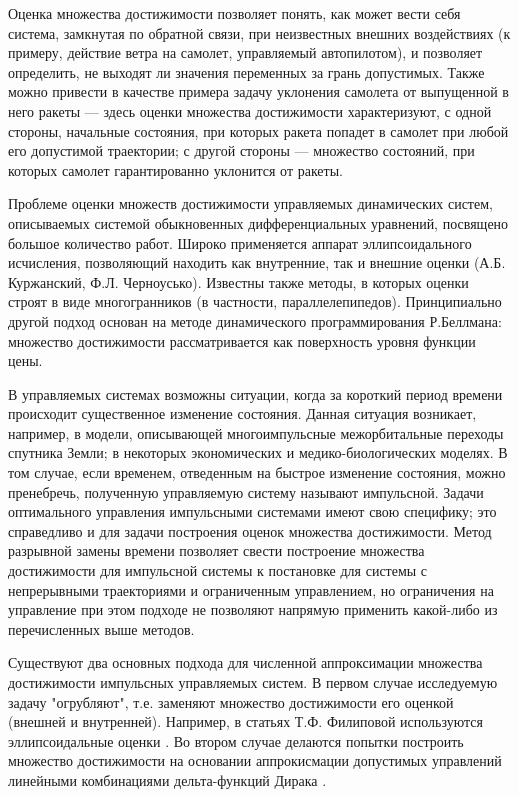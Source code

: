 \documentclass[a4paper,12pt]{article}
\begin{document}
Оценка множества достижимости позволяет понять, как может вести себя
система, замкнутая по обратной связи, при неизвестных внешних
воздействиях (к примеру, действие ветра на самолет, управляемый
автопилотом), и позволяет определить, не выходят ли значения
переменных за грань допустимых.  Также можно привести в качестве
примера задачу уклонения самолета от выпущенной в него ракеты ---
здесь оценки множества достижимости характеризуют, с одной стороны,
начальные состояния, при которых ракета попадет в самолет при любой
его допустимой траектории; с другой стороны --- множество состояний,
при которых самолет гарантированно уклонится от ракеты.

Проблеме оценки множеств достижимости управляемых динамических систем,
описываемых системой обыкновенных дифференциальных уравнений,
посвящено большое количество работ.  Широко применяется аппарат
эллипсоидального исчисления, позволяющий находить как внутренние, так
и внешние оценки (А.Б. Куржанский, Ф.Л. Черноусько).  Известны также
методы, в которых оценки строят в виде многогранников (в частности,
параллелепипедов).  Принципиально другой подход основан на методе
динамического программирования Р.Беллмана: множество достижимости
рассматривается как поверхность уровня функции цены.

В управляемых системах возможны ситуации, когда за короткий период
времени происходит существенное изменение состояния. Данная ситуация
возникает, например, в модели, описывающей многоимпульсные
межорбитальные переходы спутника Земли; в некоторых экономических и
медико-биологических моделях. В том случае, если временем, отведенным
на быстрое изменение состояния, можно пренебречь, полученную
управляемую систему называют импульсной. Задачи оптимального
управления импульсными системами имеют свою специфику; это справедливо
и для задачи построения оценок множества достижимости.  Метод
разрывной замены времени позволяет свести построение множества
достижимости для импульсной системы к постановке для системы с
непрерывными траекториями и ограниченным управлением, но ограничения
на управление при этом подходе не позволяют напрямую применить
какой-либо из перечисленных выше методов.

Существуют два основных подхода для численной аппроксимации множества
достижимости импульсных управляемых систем. В первом случае
исследуемую задачу "огрубляют", т.е. заменяют множество достижимости
его оценкой (внешней и внутренней). Например, в статьях Т.Ф. Филиповой
используются эллипсоидальные оценки \cite{FM2011}. Во втором случае
делаются попытки построить множество достижимости на основании
аппрокисмации допустимых управлений линейными комбинациями
дельта-функций Дирака \cite{BS2005}.
\end{document}
